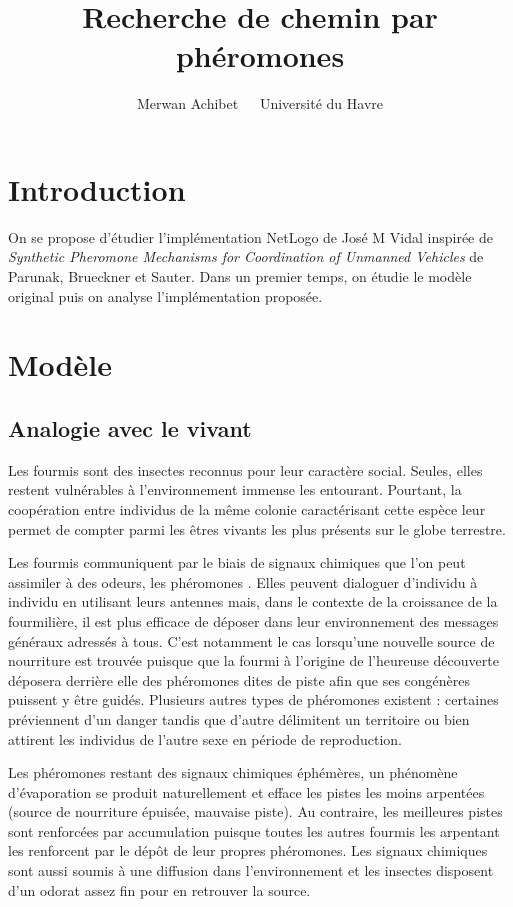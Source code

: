 \documentclass[12pt]{article}
\title{Recherche de chemin par phéromones}
\author{Merwan Achibet $\;$ \textendash $\;$  Université du Havre}
\date{}
\begin{document}
\maketitle

\section*{Introduction}

On se propose d'étudier l'implémentation NetLogo de José M Vidal
inspirée de \textit{Synthetic Pheromone Mechanisms for Coordination of
  Unmanned Vehicles} de Parunak, Brueckner et Sauter. Dans un premier
temps, on étudie le modèle original puis on analyse
l'implémentation proposée.

\section{Modèle}

\subsection{Analogie avec le vivant}

Les fourmis sont des insectes reconnus pour leur caractère
social. Seules, elles restent vulnérables à l'environnement immense
les entourant. Pourtant, la coopération entre individus de la même
colonie caractérisant cette espèce leur permet de compter
parmi les êtres vivants les plus présents sur le globe terrestre.

Les fourmis communiquent par le biais de signaux chimiques que l'on peut assimiler à des odeurs, les phéromones
\cite{insectes}. Elles peuvent dialoguer d'individu à individu en
utilisant leurs antennes mais, dans le contexte de la croissance de la
fourmilière, il est plus efficace de déposer dans leur environnement
des messages généraux adressés à tous. C'est notamment le cas
lorsqu'une nouvelle source de nourriture est trouvée puisque que la
fourmi à l'origine de l'heureuse découverte déposera derrière elle des
phéromones dites de piste afin que ses congénères puissent y être
guidés. Plusieurs autres types de phéromones existent : certaines préviennent d'un
danger tandis que d'autre délimitent un territoire ou bien attirent les individus de l'autre sexe
en période de reproduction.

Les phéromones restant des signaux chimiques éphémères, un phénomène
d'évaporation se produit naturellement et efface les pistes les moins
arpentées (source de nourriture épuisée, mauvaise piste). Au
contraire, les meilleures pistes sont renforcées par accumulation puisque
toutes les autres fourmis les arpentant les renforcent par le dépôt de
leur propres phéromones. Les signaux chimiques sont aussi soumis à une diffusion
dans l'environnement et les insectes disposent d'un odorat assez fin pour en retrouver 
la source.
\end{document}

